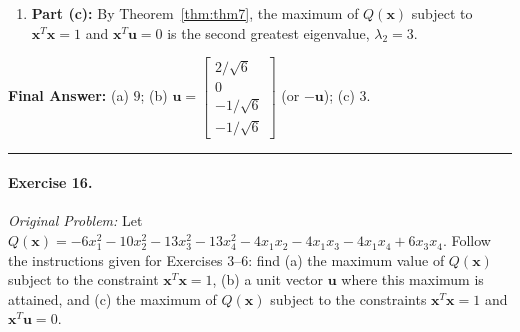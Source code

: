 \documentclass[11pt, letterpaper]{article}
\theoremstyle{definition}
\theoremstyle{remark}
\begin{document}
\begin{enumerate}[leftmargin=2em]
    \[
    \mathbf{u} = \begin{bmatrix} 2/\sqrt{6} \\ 0 \\ -1/\sqrt{6} \\ -1/\sqrt{6} \end{bmatrix} \quad \left(\text{or } -\mathbf{u} = \begin{bmatrix} -2/\sqrt{6} \\ 0 \\ 1/\sqrt{6} \\ 1/\sqrt{6} \end{bmatrix}\right).
    \]
    \item \textbf{Part (c):} By Theorem~\ref{thm:thm7}, the maximum of $Q(\mathbf{x})$ subject to $\mathbf{x}^T \mathbf{x} = 1$ and $\mathbf{x}^T \mathbf{u} = 0$ is the second greatest eigenvalue, $\lambda_2 = 3$.
\end{enumerate}
\textbf{Final Answer:} (a) $9$; \quad (b) $\mathbf{u} = \begin{bmatrix} 2/\sqrt{6} \\ 0 \\ -1/\sqrt{6} \\ -1/\sqrt{6} \end{bmatrix}$ (or $-\mathbf{u}$); \quad (c) $3$.

\medskip
\hrule
\medskip

\paragraph{Exercise 16.}
\emph{Original Problem:} Let $Q(\mathbf{x}) = -6x_1^2 - 10x_2^2 - 13x_3^2 - 13x_4^2 - 4x_1 x_2 - 4x_1 x_3 - 4x_1 x_4 + 6x_3 x_4$. Follow the instructions given for Exercises 3--6: find (a) the maximum value of $Q(\mathbf{x})$ subject to the constraint $\mathbf{x}^T \mathbf{x} = 1$, (b) a unit vector $\mathbf{u}$ where this maximum is attained, and (c) the maximum of $Q(\mathbf{x})$ subject to the constraints $\mathbf{x}^T \mathbf{x} = 1$ and $\mathbf{x}^T \mathbf{u} = 0$.
\end{document}
